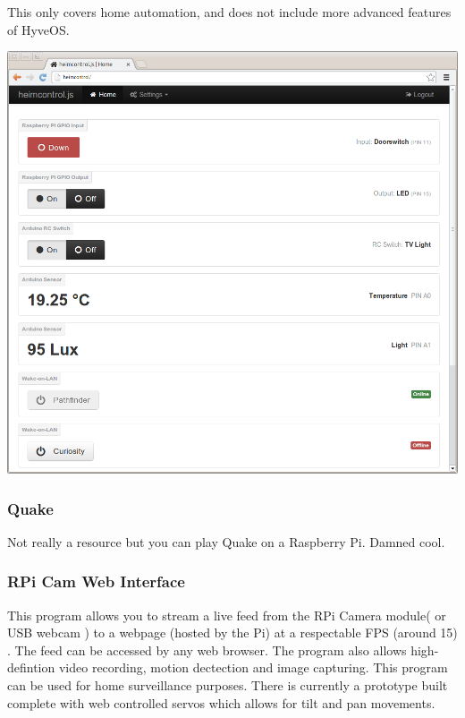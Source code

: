 \begin{multicols}{2}
			This only covers home automation, and does not include more advanced features of HyveOS.
			\begin{center}
				\includegraphics[width=.5\textwidth]{gfx/heimcontrol.png}
			\end{center}

		
		\subsubsection{Quake}
		
			Not really a resource but you can play Quake on a Raspberry Pi.
			Damned cool.
			
		
		\subsubsection{RPi Cam Web Interface}

			This program allows you to stream a live feed from the RPi Camera module( or USB webcam ) to a webpage (hosted by the Pi) at a respectable FPS (around 15) . The feed can be accessed by any web browser. The program also allows high-defintion video recording, motion dectection and image capturing. This program can be used for home surveillance purposes. There is currently a prototype built complete with web controlled servos which allows for tilt and pan movements.

			\end{multicols}
